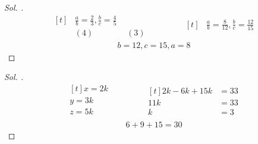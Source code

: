 \documentclass{article}
\theoremstyle{mytheoremstyle}
\theoremstyle{mytheoremstyle}
\theoremstyle{myproblemstyle}
\begin{document}
\begin{problem}[$ \frac{a}{b} = \frac{2}{3} $, $ \frac{b}{c} = \frac{4}{5} $, $ a + b + c = 105 $ ise $ a = ? $]
\end{problem}

\begin{proof}[\textit{ Sol. }]
  \begin{equation*}
    \begin{aligned}[t]
      &\frac{a}{b} = \frac{2}{3}, \frac{b}{c} = \frac{4}{5}\\
      &(4)\qquad\qquad\!(3)
    \end{aligned}
    \qquad\qquad
    \begin{aligned}[t]
      &\frac{a}{b} = \frac{8}{12}, \frac{b}{c} = \frac{12}{15}\\
    \end{aligned}
  \end{equation*}
  \begin{align*}
    b = 12, c = 15, a = 8
  \end{align*}
\end{proof}

\begin{problem}[$ \frac{x}{2} = \frac{y}{3} = \frac{z}{5} $ ve $ x - 2y + 3z = 33 $ ise $ x + y + z = ? $]
\end{problem}

\begin{proof}[\textit{ Sol. }]
  \begin{equation*}
    \begin{aligned}[t]
      x = 2k\\
      y = 3k\\
      z = 5k\\
    \end{aligned}
    \qquad\qquad
    \begin{aligned}[t]
      2k - 6k + 15k &= 33\\
      11k &= 33\\
      k &= 3
    \end{aligned}
  \end{equation*}
  \begin{align*}
    6 + 9 + 15 = 30
  \end{align*}
\end{proof}

\begin{problem}[$ \frac{x}{y} = \frac{y}{z} = \frac{z}{t} $, $ \frac{x}{t} = 8 $ ise $ \frac{x}{z} = ? $]
\end{problem}
\end{document}
